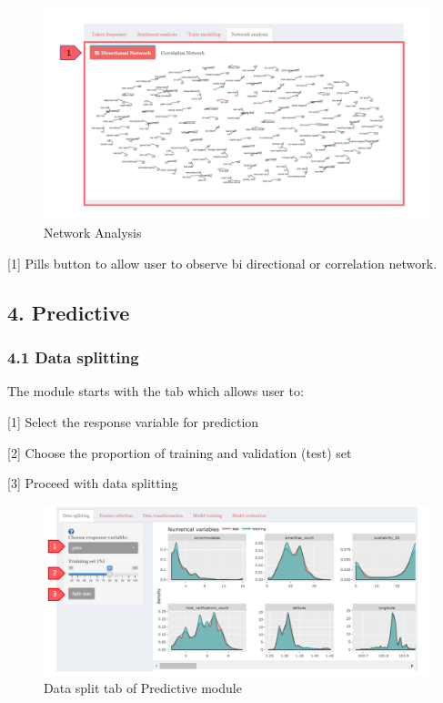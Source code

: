 \documentclass[
  12pt,
]{article}
\begin{document}
\begin{figure}[H]

{\centering \includegraphics[width=0.95\linewidth]{images/network} 

}

\caption{Network Analysis}\label{fig:unnamed-chunk-17}
\end{figure}

{[}1{]} Pills button to allow user to observe bi directional or
correlation network.

\hypertarget{predictive}{%
\subsection{4. Predictive}\label{predictive}}

\hypertarget{data-splitting}{%
\subsubsection{4.1 Data splitting}\label{data-splitting}}

The module starts with the tab which allows user to:

{[}1{]} Select the response variable for prediction

{[}2{]} Choose the proportion of training and validation (test) set

{[}3{]} Proceed with data splitting

\begin{figure}[H]

{\centering \includegraphics[width=0.95\linewidth]{images/datasplit1} 

}

\caption{Data split tab of Predictive module}\label{fig:unnamed-chunk-18}
\end{figure}
\end{document}
